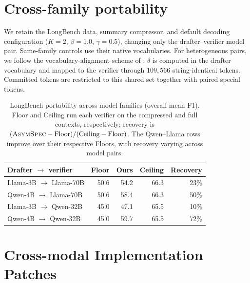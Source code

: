 \documentclass[11pt]{article}
\newcommand{\crchange}[1]{#1}
\theoremstyle{plain}
\theoremstyle{definition}
\begin{document}
\begingroup
\section{Cross-family portability}
\label{appx:cross-family}

We retain the LongBench data, summary compressor, and default decoding configuration ($K{=}2$, $\beta{=}1.0$, $\gamma{=}0.5$), changing only the drafter--verifier model pair. Same-family controls use their native vocabularies. For heterogeneous pairs, we follow the vocabulary-alignment scheme of \citet{timor2025heterogeneous}: $\delta$ is computed in the drafter vocabulary and mapped to the verifier through $109{,}566$ string-identical tokens. Committed tokens are restricted to this shared set together with paired special tokens.

\begin{table}[H]
\centering
\footnotesize
\setlength{\tabcolsep}{2.5pt}
\begin{tabular}{lrrrr}
\toprule
Drafter $\rightarrow$ verifier & Floor & Ours & Ceiling & Recovery \\
\midrule
Llama-3B $\rightarrow$ Llama-70B & 50.6 & 54.2 & 66.3 & 23\% \\
Qwen-4B $\rightarrow$ Llama-70B  & 50.6 & 58.4 & 66.3 & 50\% \\
Llama-3B $\rightarrow$ Qwen-32B  & 45.0 & 47.1 & 65.5 & 10\% \\
Qwen-4B $\rightarrow$ Qwen-32B   & 45.0 & 59.7 & 65.5 & 72\% \\
\bottomrule
\end{tabular}
\caption{\crchange{LongBench portability across model families (overall mean F1). Floor and Ceiling run each verifier on the compressed and full contexts, respectively; recovery is $(\textsc{AsymSpec}-\text{Floor})/(\text{Ceiling}-\text{Floor})$. The Qwen--Llama rows improve over their respective Floors, with recovery varying across model pairs.}}
\label{tab:cross-family}
\end{table}
\endgroup

\section{Cross-modal Implementation Patches}
\label{appx:patches}
\end{document}
